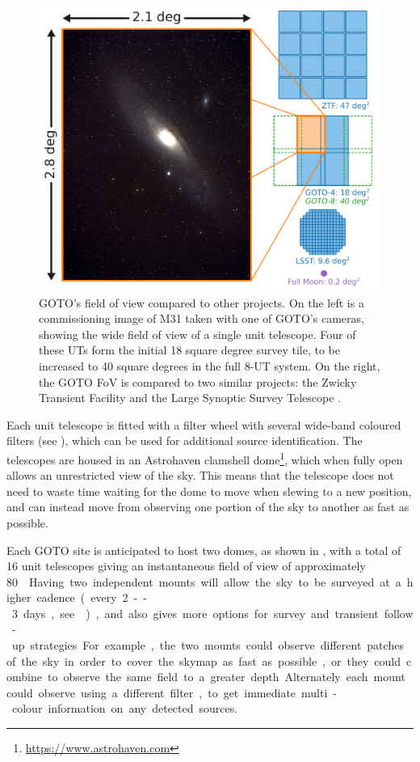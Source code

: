 \begin{colsection}
\begin{figure}[p]
    \begin{center}
        \includegraphics[width=\linewidth]{images/fov.pdf}
    \end{center}
    \caption[GOTO's field of view compared to other projects]{
        GOTO's field of view compared to other projects. On the left is a commissioning image of M31 taken with one of GOTO's cameras, showing the wide field of view of a single unit telescope. Four of these UTs form the initial 18 square degree survey tile, to be increased to 40 square degrees in the full 8-UT system. On the right, the GOTO FoV is compared to two similar projects: the Zwicky Transient Facility  \citep[ZTF,][]{ZTF} and the Large Synoptic Survey Telescope  \citep[LSST,][]{LSST}.
    }\label{fig:fov}
\end{figure}

Each unit telescope is fitted with a filter wheel with several wide-band coloured filters (see ), which can be used for additional source identification. The telescopes are housed in an Astrohaven clamshell dome\footnote{\url{https://www.astrohaven.com}}, which when fully open allows an unrestricted view of the sky. This means that the telescope does not need to waste time waiting for the dome to move when slewing to a new position, and can instead move from observing one portion of the sky to another as fast as possible.

Each GOTO site is anticipated to host two domes, as shown in , with a total of 16 unit telescopes giving an instantaneous field of view of approximately \SI{80}{\square\deg}. Having two independent mounts will allow the sky to be surveyed at a higher cadence (every 2--3 days, see ), and also gives more options for survey and transient follow-up strategies. For example, the two mounts could observe different patches of the sky in order to cover the skymap as fast as possible, or they could combine to observe the same field to a greater depth. Alternately each mount could observe using a different filter, to get immediate multi-colour information on any detected sources.


\end{colsection}
